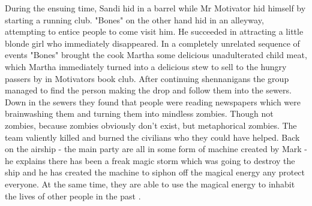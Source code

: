 During the ensuing time, Sandi hid in a barrel while Mr Motivator hid himself by starting a running club. "Bones" on the other hand hid in an alleyway, attempting to entice people to come visit him. He succeeded in attracting a little blonde girl who immediately disappeared.\medskip
In a completely unrelated sequence of events "Bones" brought the cook Martha some delicious unadulterated child meat, which Martha immediately turned into a delicious stew to sell to the hungry passers by in Motivators book club.\medskip
After continuing shennanigans the group managed to find the person making the drop and follow them into the sewers. Down in the sewers they found that people were reading newspapers which were brainwashing them and turning them into mindless zombies. Though not zombies, because zombies obviously don't exist, but metaphorical zombies.\medskip
The team valiently killed and burned the civilians who they could have helped.\medskip
Back on the airship - the main party are all in some form of machine created by Mark - he explains there has been a freak magic storm which was going to destroy the ship and he has created the machine to siphon off the magical energy any protect everyone. At the same time, they are able to use the magical energy to inhabit the lives of other people in the past .
